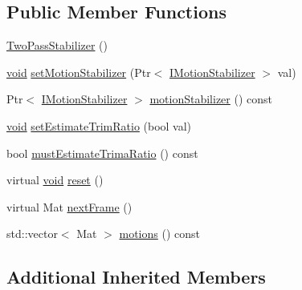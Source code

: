 \subsection*{Public Member Functions}
\begin{DoxyCompactItemize}
\item 
\hyperlink{classcv_1_1videostab_1_1TwoPassStabilizer_a6d8ba225fb09b05323886e9195f8589b}{Two\-Pass\-Stabilizer} ()
\item 
\hyperlink{legacy_8hpp_a8bb47f092d473522721002c86c13b94e}{void} \hyperlink{classcv_1_1videostab_1_1TwoPassStabilizer_af234eec62a25308270c95f7f066e74aa}{set\-Motion\-Stabilizer} (Ptr$<$ \hyperlink{classcv_1_1videostab_1_1IMotionStabilizer}{I\-Motion\-Stabilizer} $>$ val)
\item 
Ptr$<$ \hyperlink{classcv_1_1videostab_1_1IMotionStabilizer}{I\-Motion\-Stabilizer} $>$ \hyperlink{classcv_1_1videostab_1_1TwoPassStabilizer_ac179df170b8fba283917ea1f6869ca84}{motion\-Stabilizer} () const 
\item 
\hyperlink{legacy_8hpp_a8bb47f092d473522721002c86c13b94e}{void} \hyperlink{classcv_1_1videostab_1_1TwoPassStabilizer_a9c5f4df50af8214defda588f3c6be4d7}{set\-Estimate\-Trim\-Ratio} (bool val)
\item 
bool \hyperlink{classcv_1_1videostab_1_1TwoPassStabilizer_a674f1014d8b6cba4e87a8fd2df67baa3}{must\-Estimate\-Trima\-Ratio} () const 
\item 
virtual \hyperlink{legacy_8hpp_a8bb47f092d473522721002c86c13b94e}{void} \hyperlink{classcv_1_1videostab_1_1TwoPassStabilizer_af0570849907f204550d3307d5561a3e4}{reset} ()
\item 
virtual Mat \hyperlink{classcv_1_1videostab_1_1TwoPassStabilizer_a0723d29a26da06aacf398e55953a0f17}{next\-Frame} ()
\item 
std\-::vector$<$ Mat $>$ \hyperlink{classcv_1_1videostab_1_1TwoPassStabilizer_ab15e18882d06deec93fc605e3b495399}{motions} () const 
\end{DoxyCompactItemize}
\subsection*{Additional Inherited Members}


